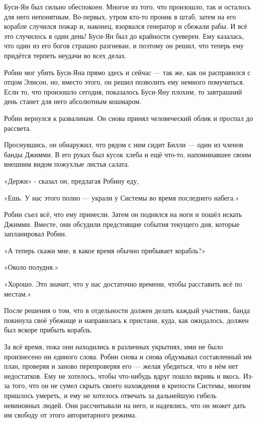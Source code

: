 \documentclass[a4paper,12pt]{book}
\begin{document}
\par
Буси-Ян был сильно обеспокоен. Многое из того, что произошло, так и осталось для него непонятным. Во-первых, утром кто-то проник в штаб, затем на его корабле случился пожар и, наконец, взорвался генератор и сбежали рабы. И всё это случилось в один день! Буси-Ян был до крайности суеверен. Ему казалась, что один из его богов страшно разгневан, и поэтому он решил, что теперь ему придётся терпеть неудачи во всех делах.
\par
Робин мог убить Буси-Яна прямо здесь и сейчас — так же, как он расправился с отцом Элисон, но, вместо этого, он решил позволить ему немного помучиться. Если то, что произошло сегодня, показалось Буси-Яну плохим, то завтрашний день станет для него абсолютным кошмаром.\\
\par
Робин вернулся к развалинам. Он снова принял человеческий облик и проспал до рассвета.
\par
Проснувшись, он обнаружил, что рядом с ним сидит Билли — один из членов банды Джимми. В его руках был кусок хлеба и ещё что-то, напоминавшее своим внешним видом пожухлые листья салата.
\par
«Держи» - сказал он, предлагая Робину еду,
\par
«Ешь. У нас этого полно — украли у Системы во время последнего набега.»
\par
Робин съел всё, что ему принесли. Затем он поднялся на ноги и пошёл искать Джимми. Вместе, они обсудили предстоящие события текущего дня, которые запланировал Робин.
\par
«А теперь скажи мне, в какое время обычно прибывает корабль?»
\par
«Около полудня.»
\par
«Хорошо. Это значит, что у нас достаточно времени, чтобы расставить всё по местам.»\\
\par
После решения о том, что в отдельности должен делать каждый участник, банда покинула своё убежище и направилась к пристани, куда, как ожидалось, должен был вскоре прибыть корабль.
\par
За всё время, пока они находились в различных укрытиях, ими не было произнесено ни единого слова. Робин снова и снова обдумывал составленный им план, проверяя и заново перепроверяя его — желая убедиться, что в нём нет недостатков. Ему не хотелось, чтобы что-нибудь вдруг пошло вкривь и вкось. Из-за того, что он не сумел скрыть своего нахождения в крепости Системы, многим пришлось умереть, и ему не хотелось отвечать за дальнейшую гибель невиновных людей. Они рассчитывали на него, и надеялись, что он может дать им свободу от этого авторитарного режима.
\end{document}
